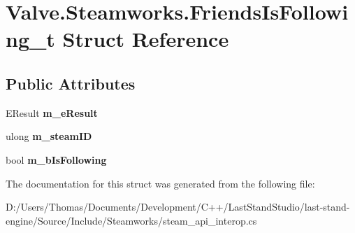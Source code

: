 \hypertarget{structValve_1_1Steamworks_1_1FriendsIsFollowing__t}{}\section{Valve.\+Steamworks.\+Friends\+Is\+Following\+\_\+t Struct Reference}
\label{structValve_1_1Steamworks_1_1FriendsIsFollowing__t}
\subsection*{Public Attributes}
\begin{DoxyCompactItemize}
\item 
\hypertarget{structValve_1_1Steamworks_1_1FriendsIsFollowing__t_a2ad7e9260b82a4af0c610dcbf0d5db73}{}E\+Result {\bfseries m\+\_\+e\+Result}\label{structValve_1_1Steamworks_1_1FriendsIsFollowing__t_a2ad7e9260b82a4af0c610dcbf0d5db73}

\item 
\hypertarget{structValve_1_1Steamworks_1_1FriendsIsFollowing__t_ab2befb6b843be599215c4bbb6cd83b77}{}ulong {\bfseries m\+\_\+steam\+I\+D}\label{structValve_1_1Steamworks_1_1FriendsIsFollowing__t_ab2befb6b843be599215c4bbb6cd83b77}

\item 
\hypertarget{structValve_1_1Steamworks_1_1FriendsIsFollowing__t_a198846253cdfec1796593f9286d419af}{}bool {\bfseries m\+\_\+b\+Is\+Following}\label{structValve_1_1Steamworks_1_1FriendsIsFollowing__t_a198846253cdfec1796593f9286d419af}

\end{DoxyCompactItemize}


The documentation for this struct was generated from the following file\+:\begin{DoxyCompactItemize}
\item 
D\+:/\+Users/\+Thomas/\+Documents/\+Development/\+C++/\+Last\+Stand\+Studio/last-\/stand-\/engine/\+Source/\+Include/\+Steamworks/steam\+\_\+api\+\_\+interop.\+cs\end{DoxyCompactItemize}
